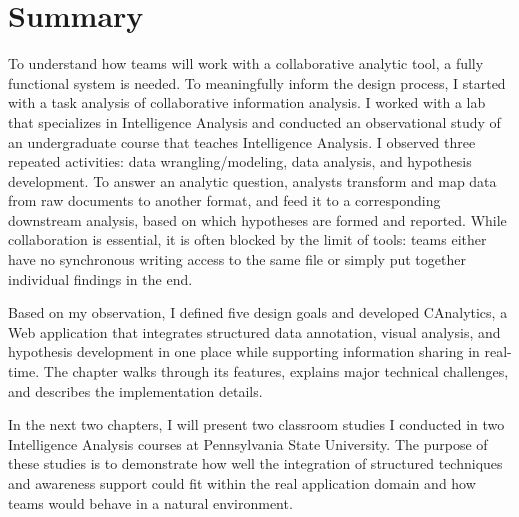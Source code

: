 \section{Summary}

To understand how teams will work with a collaborative analytic tool, a fully functional system is needed. To meaningfully inform the design process, I started with a task analysis of collaborative information analysis. I worked with a lab that specializes in Intelligence Analysis and conducted an observational study of an undergraduate course that teaches Intelligence Analysis. I observed three repeated activities: data wrangling/modeling, data analysis, and hypothesis development. To answer an analytic question, analysts transform and map data from raw documents to another format, and feed it to a corresponding downstream analysis, based on which hypotheses are formed and reported. While collaboration is essential, it is often blocked by the limit of tools: teams either have no synchronous writing access to the same file or simply put together individual findings in the end. 

Based on my observation, I defined five design goals and developed CAnalytics, a Web application that integrates structured data annotation, visual analysis, and hypothesis development in one place while supporting information sharing in real-time. The chapter walks through its features, explains major technical challenges, and describes the implementation details. 

In the next two chapters, I will present two classroom studies I conducted in two Intelligence Analysis courses at Pennsylvania State University. The purpose of these studies is to demonstrate how well the integration of structured techniques and awareness support could fit within the real application domain and how teams would behave in a natural environment.